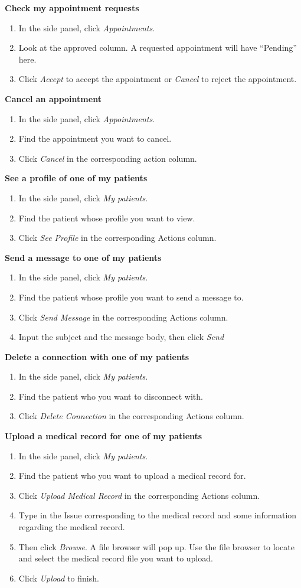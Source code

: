 \textbf{Check my appointment requests}
\begin{enumerate}
\item In the side panel, click \textit{ Appointments}.
\item Look at the approved column. A requested appointment will have ``Pending'' here.
\item Click \textit{Accept} to accept the appointment or \textit{Cancel} to reject the appointment.
\end{enumerate}
\textbf{Cancel an appointment}
\begin{enumerate}
\item In the side panel, click \textit{Appointments}.
\item Find the appointment you want to cancel. 
\item Click \textit{Cancel} in the corresponding action column.
\end{enumerate}
\textbf{See a profile of one of my patients}
\begin{enumerate}
\item In the side panel, click \textit{My patients}.
\item Find the patient whose profile you want to view.
\item Click \textit{See Profile} in the corresponding Actions column.
\end{enumerate}
\textbf{Send a message to one of my patients}
\begin{enumerate}
\item In the side panel, click \textit{My patients}.
\item Find the patient whose profile you want to send a message to.
\item Click \textit{Send Message} in the corresponding Actions column.
\item Input the subject and the message body, then click \textit{Send}
\end{enumerate}
\textbf{Delete a connection with one of my patients}
\begin{enumerate}
\item In the side panel, click \textit{My patients}.
\item Find the patient who you want to disconnect with.
\item Click \textit{Delete Connection} in the corresponding Actions column.
\end{enumerate}
\textbf{Upload a medical record for one of my patients}
\begin{enumerate}
\item In the side panel, click \textit{My patients}.
\item Find the patient who you want to upload a medical record for.
\item Click \textit{Upload Medical Record} in the corresponding Actions column.
\item Type in the Issue corresponding to the medical record and some information regarding the medical record.
\item Then click \textit{Browse}. A file browser will pop up. Use the file browser to locate and select the medical record file you want to upload.
\item Click \textit{Upload} to finish.
\end{enumerate}
